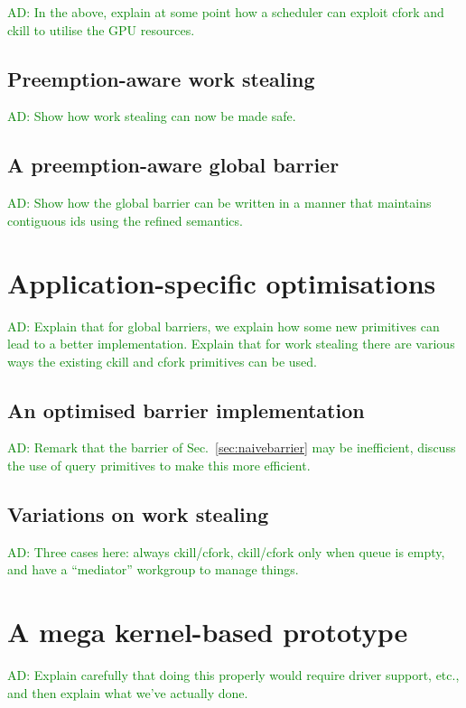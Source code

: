 \documentclass[nocopyrightspace]{sigplanconf-pldi16}
\newcommand{\ADComment}[1]{\textcolor{green}{AD: #1}}
\newcommand{\mysec}{Sec.~}
\begin{document}
\ADComment{In the above, explain at some point how a scheduler can
  exploit cfork and ckill to utilise the GPU resources.}

\subsection{Preemption-aware work stealing}

\ADComment{Show how work stealing can now be made safe.}

\subsection{A preemption-aware global barrier}

\ADComment{Show how the global barrier can be written in a manner that
  maintains contiguous ids using the refined semantics.}


\section{Application-specific optimisations}

\ADComment{Explain that for global barriers, we explain how some new
  primitives can lead to a better implementation.  Explain that for
  work stealing there are various ways the existing ckill and cfork
  primitives can be used.}

\subsection{An optimised barrier implementation}

\ADComment{Remark that the barrier of \mysec\ref{sec:naivebarrier} may
  be inefficient, discuss the use of query primitives to make this
  more efficient.}

\subsection{Variations on work stealing}

\ADComment{Three cases here: always ckill/cfork, ckill/cfork only when
  queue is empty, and have a ``mediator'' workgroup to manage things.}


\section{A mega kernel-based prototype}

\ADComment{Explain carefully that doing this properly would require
  driver support, etc., and then explain what we've actually done.}
\end{document}
